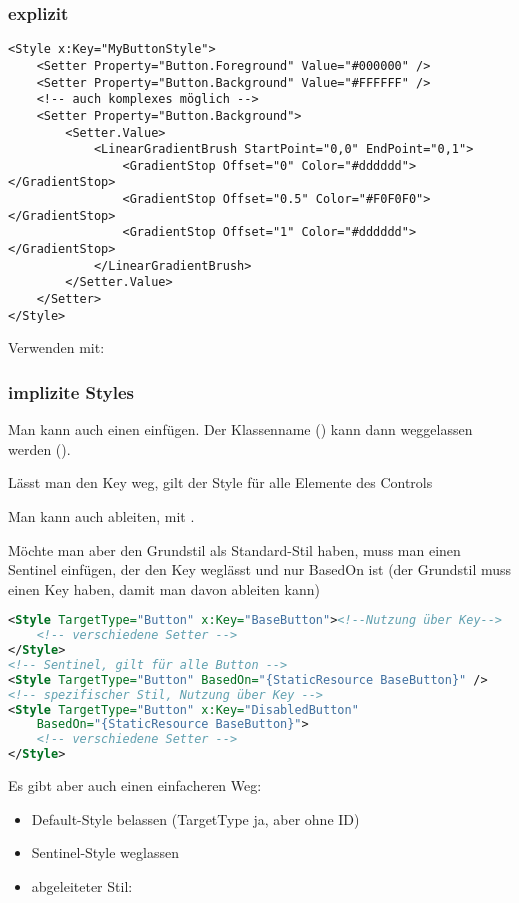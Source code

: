 \subsubsection{explizit}
\begin{lstlisting}
<Style x:Key="MyButtonStyle">
    <Setter Property="Button.Foreground" Value="#000000" />
    <Setter Property="Button.Background" Value="#FFFFFF" />
    <!-- auch komplexes möglich -->
    <Setter Property="Button.Background">
        <Setter.Value>
            <LinearGradientBrush StartPoint="0,0" EndPoint="0,1">
                <GradientStop Offset="0" Color="#dddddd"></GradientStop>
                <GradientStop Offset="0.5" Color="#F0F0F0"></GradientStop>
                <GradientStop Offset="1" Color="#dddddd"></GradientStop>
            </LinearGradientBrush>
        </Setter.Value>
    </Setter>
</Style>
\end{lstlisting}

Verwenden mit:\\

\subsubsection{implizite Styles}
Man kann auch einen  einfügen. Der Klassenname () kann dann weggelassen werden ().

Lässt man den Key weg, gilt der Style für alle Elemente des Controls

Man kann auch ableiten, mit .

Möchte man aber den Grundstil als Standard-Stil haben, muss man einen Sentinel einfügen, der den Key weglässt und nur BasedOn ist (der Grundstil muss einen Key haben, damit man davon ableiten kann)

\begin{lstlisting}[language=xml]
<Style TargetType="Button" x:Key="BaseButton"><!--Nutzung über Key-->
    <!-- verschiedene Setter -->
</Style>
<!-- Sentinel, gilt für alle Button -->
<Style TargetType="Button" BasedOn="{StaticResource BaseButton}" />
<!-- spezifischer Stil, Nutzung über Key -->
<Style TargetType="Button" x:Key="DisabledButton" 
    BasedOn="{StaticResource BaseButton}">
    <!-- verschiedene Setter -->
</Style>
\end{lstlisting}

Es gibt aber auch einen einfacheren Weg:
\begin{itemize}
    \item Default-Style belassen (TargetType ja, aber ohne ID)
    \item Sentinel-Style weglassen
    \item abgeleiteter Stil: 
\end{itemize}

